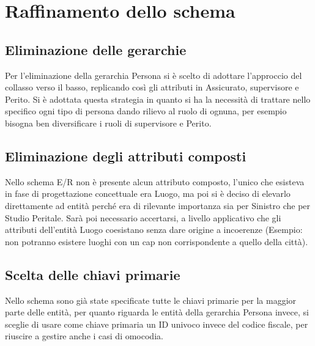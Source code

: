 \documentclass[a4paper,12pt]{report}
\begin{document}
\clearpage
\section{Raffinamento dello schema}

\subsection{Eliminazione delle gerarchie}
Per l’eliminazione della gerarchia Persona si è scelto di adottare l’approccio del collasso verso il basso, replicando così gli attributi in Assicurato, supervisore e Perito.
Si è adottata questa strategia in quanto si ha la necessità di trattare nello specifico ogni tipo di persona dando rilievo al ruolo di ognuna, per esempio bisogna ben diversificare i ruoli di supervisore e Perito.
\\
\subsection{Eliminazione degli attributi composti}
Nello schema E/R non è presente alcun attributo composto, l'unico che esisteva in fase di progettazione concettuale era Luogo, ma poi si è deciso di elevarlo direttamente ad entità perché era di rilevante importanza sia per Sinistro che per Studio Peritale.
Sarà poi necessario accertarsi, a livello applicativo che gli attributi dell'entità Luogo coesistano senza dare origine a incoerenze (Esempio: non potranno esistere luoghi con un cap non corrispondente a quello della città).
\\
\subsection{Scelta delle chiavi primarie}
Nello schema sono già state specificate tutte le chiavi primarie per la maggior parte delle entità, per quanto riguarda le entità della gerarchia Persona invece, si sceglie di usare come chiave primaria un ID univoco invece del codice fiscale, per riuscire a gestire anche i casi di omocodia.

\clearpage
\end{document}
